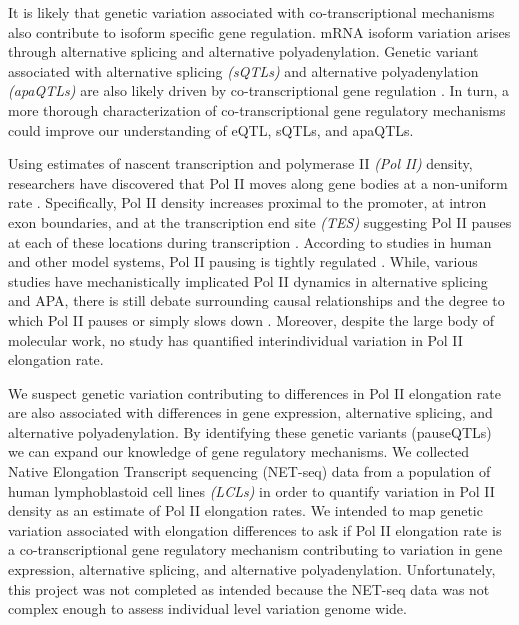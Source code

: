 It is likely that genetic variation associated with co-transcriptional mechanisms also contribute to isoform specific gene regulation. mRNA isoform variation arises through alternative splicing and alternative polyadenylation. Genetic variant associated with alternative splicing \emph{(sQTLs)} and alternative polyadenylation \emph{(apaQTLs)} are also likely driven by co-transcriptional gene regulation \citep{li_rna_2016, mittleman_alternative_2020}. In turn, a more thorough characterization of co-transcriptional gene regulatory mechanisms could improve our understanding of eQTL, sQTLs, and apaQTLs. 


Using estimates of nascent transcription and polymerase II \emph{(Pol II)} density, researchers have discovered that Pol II moves along gene bodies at a non-uniform rate \citep{mayer_native_2015,nojima_mammalian_2015, mahat_base-pair-resolution_2016, day_comprehensive_2016, jonkers_genome-wide_2014}. Specifically, Pol II density increases proximal to the promoter, at intron exon boundaries, and at the transcription end site \emph{(TES)} suggesting Pol II pauses at each of these locations during transcription \citep{adelman_promoter-proximal_2012, zeitlinger_rna_2007,rahl_c-myc_2010}.  According to studies in human and other model systems, Pol II pausing is tightly regulated \citep{nojima_mammalian_2015, carrillo_oesterreich_global_2010, proudfoot_transcriptional_2016,gromak_pause_2006}. While, various studies have mechanistically implicated Pol II dynamics in alternative splicing and APA, there is still debate surrounding causal relationships and the degree to which Pol II pauses or simply slows down \citep{price_transient_2018,reimer_rapid_2020}. Moreover, despite the large body of molecular work, no study has quantified interindividual variation in Pol II elongation rate. 

We suspect genetic variation contributing to differences in Pol II elongation rate are also associated with differences in gene expression, alternative splicing, and alternative polyadenylation. By identifying these genetic variants (pauseQTLs) we can expand our knowledge of gene regulatory mechanisms. We collected Native Elongation Transcript sequencing (NET-seq) data from a population of human lymphoblastoid cell lines \emph{(LCLs)} in order to quantify variation in Pol II density as an estimate of Pol II elongation rates. We intended to map genetic variation associated with elongation differences to ask if Pol II elongation rate is a co-transcriptional gene regulatory mechanism contributing to variation in gene expression, alternative splicing, and alternative polyadenylation. Unfortunately, this project was not completed as intended because the NET-seq data was not complex enough to assess individual level variation genome wide. 


